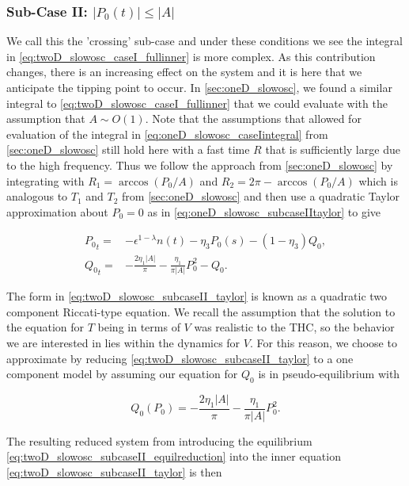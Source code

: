 \subsubsection{Sub-Case II: $|P_0(t)|\le |A|$}

We call this the 'crossing' sub-case and under these conditions we see the integral in \eqref{eq:twoD_slowosc_caseI_fullinner} is more complex. As this contribution changes, there is an increasing effect on the system and it is here that we anticipate the tipping point to occur. In \autoref{sec:oneD_slowosc}, we found a similar integral to \eqref{eq:twoD_slowosc_caseI_fullinner} that we could evaluate with the assumption that $A\sim O(1)$. Note that the assumptions that allowed for evaluation of the integral in \eqref{eq:oneD_slowosc_caseIintegral} from \autoref{sec:oneD_slowosc} still hold here with a fast time $R$ that is sufficiently large due to the high frequency. Thus we follow the approach from \autoref{sec:oneD_slowosc} by integrating with $R_1=\arccos(P_0/A)$ and $R_2 = 2\pi-\arccos(P_0/A)$ which is analogous to $T_1$ and $T_2$ from \autoref{sec:oneD_slowosc} and then use a quadratic Taylor approximation about $P_0=0$ as in \eqref{eq:oneD_slowosc_subcaseIItaylor} to give

\begin{equation}\label{eq:twoD_slowosc_subcaseII_taylor}
\begin{aligned}
{P_0}_t =& -\epsilon^{1-\lambda}n(t)-\eta_3 P_0(s)-(1-\eta_3)Q_0,\\
{Q_0}_t =&-\frac{2\eta_1|A|}{\pi}-\frac{\eta_1}{\pi|A|}P_0^2-Q_0.
\end{aligned}
\end{equation}

\indent The form in \eqref{eq:twoD_slowosc_subcaseII_taylor} is known as a quadratic two component Riccati-type equation. We recall the assumption that the solution to the equation for $T$ being in terms of $V$ was realistic to the THC, so the behavior we are interested in lies within the dynamics for $V$. For this reason, we choose to approximate by reducing \eqref{eq:twoD_slowosc_subcaseII_taylor} to a one component model by assuming our equation for $Q_0$ is in pseudo-equilibrium with 

\begin{equation}\label{eq:twoD_slowosc_subcaseII_equilreduction}
{Q_0}(P_0) = -\frac{2\eta_1|A|}{\pi}-\frac{\eta_1}{\pi|A|}P_0^2.
\end{equation}

The resulting reduced system from introducing the equilibrium \eqref{eq:twoD_slowosc_subcaseII_equilreduction} into the inner equation \eqref{eq:twoD_slowosc_subcaseII_taylor} is then

